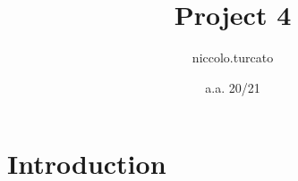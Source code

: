 \documentclass{article}
\title{Project 4}
\author{niccolo.turcato}
\date{a.a. 20/21}
\begin{document}
\maketitle

\section{Introduction}
\end{document}

